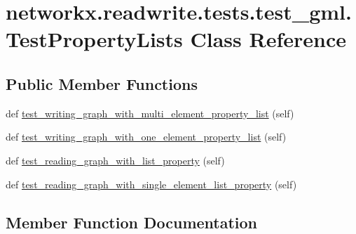 \hypertarget{classnetworkx_1_1readwrite_1_1tests_1_1test__gml_1_1TestPropertyLists}{}\section{networkx.\+readwrite.\+tests.\+test\+\_\+gml.\+Test\+Property\+Lists Class Reference}
\label{classnetworkx_1_1readwrite_1_1tests_1_1test__gml_1_1TestPropertyLists}
\subsection*{Public Member Functions}
\begin{DoxyCompactItemize}
\item 
def \hyperlink{classnetworkx_1_1readwrite_1_1tests_1_1test__gml_1_1TestPropertyLists_ac2cdc44016c5d9d02327b66edac8a577}{test\+\_\+writing\+\_\+graph\+\_\+with\+\_\+multi\+\_\+element\+\_\+property\+\_\+list} (self)
\item 
def \hyperlink{classnetworkx_1_1readwrite_1_1tests_1_1test__gml_1_1TestPropertyLists_a93a2c0d305188960672c022aa8001ed0}{test\+\_\+writing\+\_\+graph\+\_\+with\+\_\+one\+\_\+element\+\_\+property\+\_\+list} (self)
\item 
def \hyperlink{classnetworkx_1_1readwrite_1_1tests_1_1test__gml_1_1TestPropertyLists_a3f291f1115b66f8c76a228609e94a876}{test\+\_\+reading\+\_\+graph\+\_\+with\+\_\+list\+\_\+property} (self)
\item 
def \hyperlink{classnetworkx_1_1readwrite_1_1tests_1_1test__gml_1_1TestPropertyLists_a160c68924a3864d02a7a53537d31d1e3}{test\+\_\+reading\+\_\+graph\+\_\+with\+\_\+single\+\_\+element\+\_\+list\+\_\+property} (self)
\end{DoxyCompactItemize}


\subsection{Member Function Documentation}
\mbox{\label{classnetworkx_1_1readwrite_1_1tests_1_1test__gml_1_1TestPropertyLists_a3f291f1115b66f8c76a228609e94a876}} 
